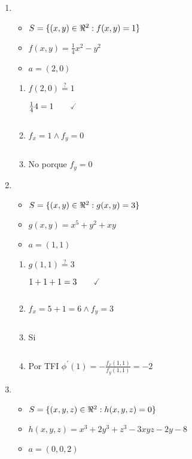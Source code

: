\documentclass[../practica_04.tex]{subfiles}
\begin{document}
    \begin{enumerate}
        \item
            \begin{itemize}
                \item $ S = \{(x,y) \in \real^2: f(x,y) = 1 \} $
                \item $ f(x,y) = \frac{1}{4}x^2 - y^2 $
                \item $ a = (2,0)$
            \end{itemize}

            \begin{enumerate}
                \item $ f(2,0) \stackrel{?}{=} 1 $

                    $ \frac{1}{4}4 = 1 \qquad\checked $

                    $ $

                \item $ f_x = 1 \wedge f_y = 0 $

                    $ $

                \item No porque $f_y = 0$
            \end{enumerate}

        \item
            \begin{itemize}
                \item $ S = \{(x,y) \in \real^2: g(x,y) = 3 \} $
                \item $ g(x,y) = x^5 + y^2 + xy $
                \item $ a = (1,1)$
            \end{itemize}

            \begin{enumerate}
                \item $ g(1,1) \stackrel{?}{=} 3 $

                    $ 1 + 1 + 1 = 3 \qquad\checked $

                    $ $

                \item $ f_x = 5 + 1 = 6 \wedge f_y = 3 $

                    $ $

                \item Si

                    $ $

                \item Por TFI $ \phi^\prime(1) = -\frac{f_x(1,1)}{f_y(1,1)} = -2 $
            \end{enumerate}
        \item
            \begin{itemize}
                \item $ S = \{(x,y,z) \in \real^2: h(x,y,z) = 0 \} $
                \item $ h(x,y,z) = x^3 + 2y^3 + z^3 - 3xyz - 2y - 8 $
                \item $ a = (0,0,2)$
            \end{itemize}


\end{enumerate}
\end{document}
